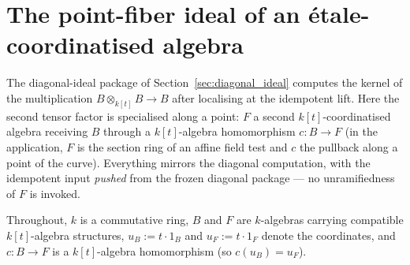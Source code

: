 \section{The point-fiber ideal of an \'etale-coordinatised algebra}
\label{sec:point_fiber_ideal}

The diagonal-ideal package of Section~\ref{sec:diagonal_ideal} computes the kernel of the
multiplication \(B \otimes_{k[t]} B \to B\) after localising at the idempotent lift. Here
the second tensor factor is specialised along a point: \(F\) a second
\(k[t]\)-coordinatised algebra receiving \(B\) through a \(k[t]\)-algebra homomorphism
\(c \colon B \to F\) (in the application, \(F\) is the section ring of an affine field test
and \(c\) the pullback along a point of the curve). Everything mirrors the diagonal
computation, with the idempotent input \emph{pushed} from the frozen diagonal package — no
unramifiedness of \(F\) is invoked.

Throughout, \(k\) is a commutative ring, \(B\) and \(F\) are \(k\)-algebras carrying
compatible \(k[t]\)-algebra structures, \(u_B := t \cdot 1_B\) and \(u_F := t \cdot 1_F\)
denote the coordinates, and \(c \colon B \to F\) is a \(k[t]\)-algebra homomorphism (so
\(c(u_B) = u_F\)).

